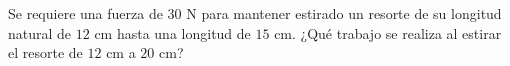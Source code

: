 \item Se requiere una fuerza de $30 \text{ N}$ para mantener estirado un resorte de su longitud natural de $12 \text{ cm}$ hasta una longitud de $15 \text{ cm}$. ¿Qué trabajo se realiza al estirar el resorte de $12 \text{ cm}$ a $20 \text{ cm}$?
